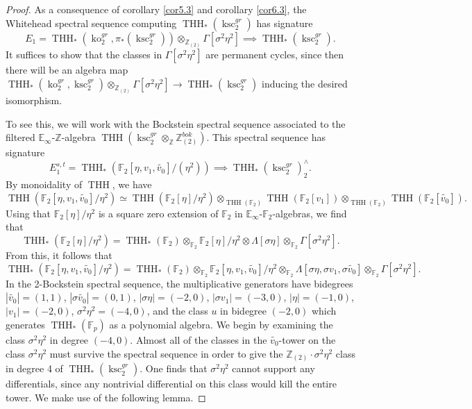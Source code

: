 \documentclass[11pt,leqno]{article}
\newcommand{\zz}{\mathbb{Z}}
\newcommand{\bb}[1]{\mathbb{#1}}
\newcommand{\fff}{\mathbb{F}}
\DeclareMathOperator{\THH}{THH}
\DeclareMathOperator{\ksc}{ksc}
\DeclareMathOperator{\ko}{ko}
\newtheorem*{short hand}{theorem name}
\theoremstyle{plain}  %
\theoremstyle{definition}
\numberwithin{equation}{section}
\begin{document}
\begin{proof}
As a consequence of corollary \ref{cor5.3} and corollary \ref{cor6.3}, the Whitehead spectral sequence computing $\THH_*(\ksc_2^{gr})$ has signature $$E_1=\THH_*(\ko_2^{gr},\pi_*(\ksc_2^{gr}))\otimes_{\zz_{(2)}}\Gamma[\sigma^2\eta^2]\implies \THH_*(\ksc_2^{gr}).$$  It suffices to show that the classes in $\Gamma[\sigma^2\eta^2]$ are permanent cycles, since then there will be an algebra map $\THH_*(\ko_2^{gr},\ksc_2^{gr})\otimes_{\zz_{(2)}}\Gamma[\sigma^2\eta^2]\to \THH_*(\ksc_2^{gr})$ inducing the desired isomorphism.

To see this, we will work with the Bockstein spectral sequence associated to the filtered $\bb{E}_{\infty}$-$\zz$-algebra $\THH(\ksc_2^{gr}\otimes_{\zz}\zz_{(2)}^{bok})$.  This spectral sequence has signature $$E_1^{s,t}=\THH_*(\fff_2[\eta,v_1,\tilde{v_0}]/(\eta^2))\implies \THH_*(\ksc_2^{gr})_2^{\wedge}.$$  By monoidality of $\THH$, we have $$\THH(\fff_2[\eta,v_1,\tilde{v_0}]/\eta^2)\simeq \THH(\fff_2[\eta]/\eta^2)\otimes_{\THH(\fff_2)}\THH(\fff_2[v_1])\otimes_{\THH(\fff_2)}\THH(\fff_2[\tilde{v_0}]).$$  Using that $\fff_2[\eta]/\eta^2$ is a square zero extension of $\fff_2$ in $\bb{E}_{\infty}$-$\fff_2$-algebras, we find that $$\THH_*(\fff_2[\eta]/\eta^2)=\THH_*(\fff_2)\otimes_{\fff_2}\fff_2[\eta]/\eta^2\otimes\Lambda[\sigma\eta]\otimes_{\fff_2} \Gamma[\sigma^2\eta^2].$$  From this, it follows that $$\THH_*(\fff_2[\eta,v_1,\tilde{v_0}]/\eta^2)=\THH_*(\fff_2)\otimes_{\fff_2}\fff_2[\eta,v_1,\tilde{v_0}]/\eta^2\otimes_{\fff_2}\Lambda[\sigma\eta,\sigma v_1,\sigma \tilde{v_0}]\otimes_{\fff_2} \Gamma[\sigma^2 \eta^2].$$
In the 2-Bockstein spectral sequence, the multiplicative generators have bidegrees $|\tilde{v_0}|=(1,1)$, $|\sigma\tilde{v_0}|=(0,1)$, $|\sigma\eta|=(-2,0)$, $|\sigma v_1|=(-3,0)$, $|\eta|=(-1,0)$, $|v_1|=(-2,0)$,  $\sigma^2\eta^2=(-4,0)$, and the class $u$ in bidegree $(-2,0)$ which generates $\THH_*(\fff_p)$ as a polynomial algebra.  We begin by examining the class $\sigma^2\eta^2$ in degree $(-4,0)$.  Almost all of the classes in the $\tilde{v_0}$-tower on the class $\sigma^2\eta^2$ must survive the spectral sequence in order to give the $\zz_{(2)}\cdot \sigma^2\eta^2$ class in degree 4 of $\THH_*(\ksc_2^{gr})$.  One finds that $\sigma^2\eta^2$ cannot support any differentials, since any nontrivial differential on this class would kill the entire tower.  We make use of the following lemma.


\end{proof}
\end{document}
